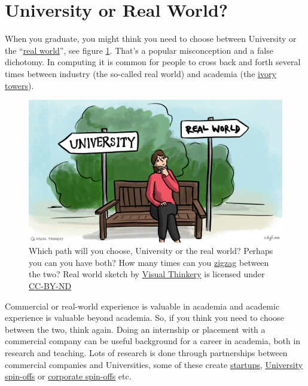 \documentclass[
]{book}
\begin{document}
\hypertarget{realworld}{%
\section{University or Real World?}\label{realworld}}

When you graduate, you might think you need to choose between University or the ``\href{https://en.wikipedia.org/wiki/Real_life}{real world}'', see figure \ref{fig:realworld-fig}. That's a popular misconception and a false dichotomy. In computing it is common for people to cross back and forth several times between industry (the so-called real world) and academia (the \href{https://en.wikipedia.org/wiki/Ivory_tower}{ivory towers}).

\begin{figure}

{\centering \includegraphics[width=1\linewidth]{images/University-or-real-world} 

}

\caption{Which path will you choose, University or the real world? Perhaps you can you have both? How many times can you \href{https://en.wikipedia.org/wiki/Zigzag}{zigzag} between the two? Real world sketch by \href{https://visualthinkery.com/}{Visual Thinkery} is licensed under \href{https://creativecommons.org/licenses/by-nd/4.0/}{CC-BY-ND}}\label{fig:realworld-fig}
\end{figure}



Commercial or real-world experience is valuable in academia and academic experience is valuable beyond academia. So, if you think you need to choose between the two, think again. Doing an internship or placement with a commercial company can be useful background for a career in academia, both in research and teaching. Lots of research is done through partnerships between commercial companies and Universities, some of these create \href{https://en.wikipedia.org/wiki/Startup_company}{startups}, \href{https://en.wikipedia.org/wiki/University_spin-off}{University spin-offs} or \href{https://en.wikipedia.org/wiki/Corporate_spin-off}{corporate spin-offs} etc.
\end{document}
